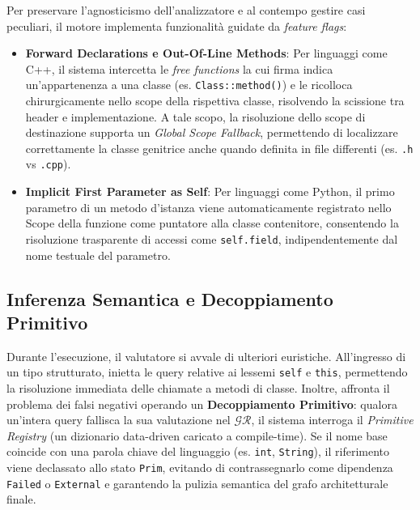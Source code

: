 Per preservare l'agnosticismo dell'analizzatore e al contempo gestire
casi peculiari, il motore implementa funzionalità guidate da
\textit{feature flags}:
\begin{itemize}
  \item \textbf{Forward Declarations e Out-Of-Line Methods}: Per
    linguaggi come C++, il sistema intercetta le \textit{free
    functions} la cui firma indica un'appartenenza a una classe (es.
    \texttt{Class::method()}) e le ricolloca chirurgicamente nello
    scope della rispettiva classe, risolvendo la scissione tra header
    e implementazione. A tale scopo, la risoluzione dello scope 
    di destinazione supporta un \textit{Global Scope Fallback},
    permettendo di localizzare correttamente la classe genitrice 
    anche quando definita in file differenti (es. \texttt{.h} vs \texttt{.cpp}).
  \item \textbf{Implicit First Parameter as Self}: Per linguaggi come
    Python, il primo parametro di un metodo d'istanza viene
    automaticamente registrato nello Scope della funzione come
    puntatore alla classe contenitore, consentendo la risoluzione
    trasparente di accessi come \texttt{self.field},
    indipendentemente dal nome testuale del parametro.
\end{itemize}

\subsection{Inferenza Semantica e Decoppiamento Primitivo}
Durante l'esecuzione, il valutatore si avvale di ulteriori euristiche.
All'ingresso di un tipo strutturato, inietta le query relative ai
lessemi \texttt{self} e \texttt{this}, permettendo la risoluzione
immediata delle chiamate a metodi di classe. Inoltre, affronta il
problema dei falsi negativi operando un \textbf{Decoppiamento
Primitivo}: qualora un'intera query fallisca la sua valutazione nel
$\mathcal{GR}$, il sistema interroga il \textit{Primitive Registry}
(un dizionario data-driven caricato a compile-time). Se il nome base
coincide con una parola chiave del linguaggio (es. \texttt{int},
\texttt{String}), il riferimento viene declassato allo stato
\texttt{Prim}, evitando di contrassegnarlo come dipendenza
\texttt{Failed} o \texttt{External} e garantendo la pulizia semantica
del grafo architetturale finale.

